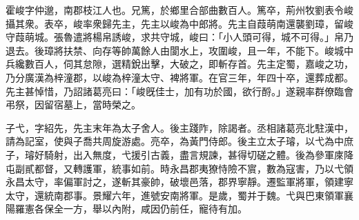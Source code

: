 \begin{pinyinscope}
 
 
 霍峻字仲邈，南郡枝江人也。兄篤，於鄉里合部曲數百人。篤卒，荊州牧劉表令峻攝其衆。表卒，峻率衆歸先主，先主以峻為中郎將。先主自葭萌南還襲劉璋，留峻守葭萌城。張魯遣將楊帛誘峻，求共守城，峻曰：「小人頭可得，城不可得。」帛乃退去。後璋將扶禁、向存等帥萬餘人由閬水上，攻圍峻，且一年，不能下。峻城中兵纔數百人，伺其怠隙，選精銳出擊，大破之，即斬存首。先主定蜀，嘉峻之功，乃分廣漢為梓潼郡，以峻為梓潼太守、裨將軍。在官三年，年四十卒，還葬成都。先主甚悼惜，乃詔諸葛亮曰：「峻旣佳士，加有功於國，欲行酹。」遂親率群僚臨會弔祭，因留宿墓上，當時榮之。
 
 
 
 
 子弋，字紹先，先主末年為太子舍人。後主踐阼，除謁者。丞相諸葛亮北駐漢中，請為記室，使與子喬共周旋游處。亮卒，為黃門侍郎。後主立太子璿，以弋為中庶子，璿好騎射，出入無度，弋援引古義，盡言規諫，甚得切磋之體。後為參軍庲降屯副貳都督，又轉護軍，統事如前。時永昌郡夷獠恃險不賔，數為寇害，乃以弋領永昌太守，率偏軍討之，遂斬其豪帥，破壞邑落，郡界寧靜。遷監軍將軍，領建寧太守，還統南郡事。景耀六年，進號安南將軍。是歲，蜀并于魏。弋與巴東領軍襄陽羅憲各保全一方，舉以內附，咸因仍前任，寵待有加。
 

\end{pinyinscope}
